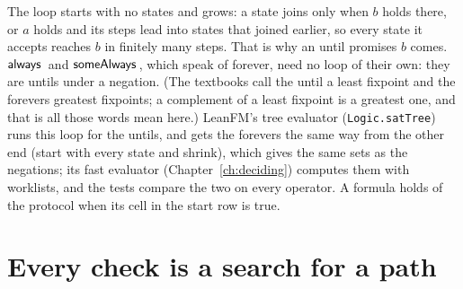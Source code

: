 The loop starts with no states and grows: a state joins only when $b$ holds there, or $a$
holds and its steps lead into states that joined earlier, so every state it accepts reaches
$b$ in finitely many steps. That is why an until promises $b$ comes. $\mathsf{always}\,$ and
$\mathsf{someAlways}\,$, which speak of forever, need no loop of their own: they are untils under a
negation. (The textbooks call the until a least fixpoint and the forevers greatest
fixpoints; a complement of a least fixpoint is a greatest one, and that is all those words
mean here.)
LeanFM's tree evaluator (\texttt{Logic.satTree}) runs this loop for the untils, and gets the
forevers the same way from the other end (start with every state and shrink), which gives
the same sets as the negations; its fast evaluator (Chapter~\ref{ch:deciding}) computes them
with worklists, and the tests compare the
two on every operator. A formula holds of the protocol when its cell in the start row is
true.

\section{Every check is a search for a path}

